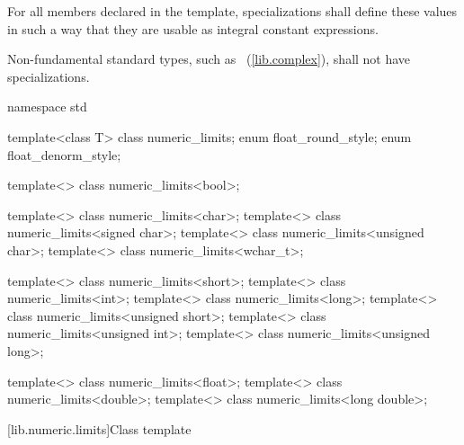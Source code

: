 \pnum
For all members declared
 
in the
template, specializations shall define these values in such a way
that they are usable as integral constant expressions.

\pnum
Non-fundamental standard types, such as
~(\ref{lib.complex}), shall not have specializations.

%
%
%
%
%
%

\begin{codeblock}
namespace std {
  template<class T> class numeric_limits;
  enum float_round_style;
  enum float_denorm_style;

  template<> class numeric_limits<bool>;

  template<> class numeric_limits<char>;
  template<> class numeric_limits<signed char>;
  template<> class numeric_limits<unsigned char>;
  template<> class numeric_limits<wchar_t>;

  template<> class numeric_limits<short>;
  template<> class numeric_limits<int>;
  template<> class numeric_limits<long>;
  template<> class numeric_limits<unsigned short>;
  template<> class numeric_limits<unsigned int>;
  template<> class numeric_limits<unsigned long>;

  template<> class numeric_limits<float>;
  template<> class numeric_limits<double>;
  template<> class numeric_limits<long double>;
}
\end{codeblock}

[lib.numeric.limits]{Class template }

